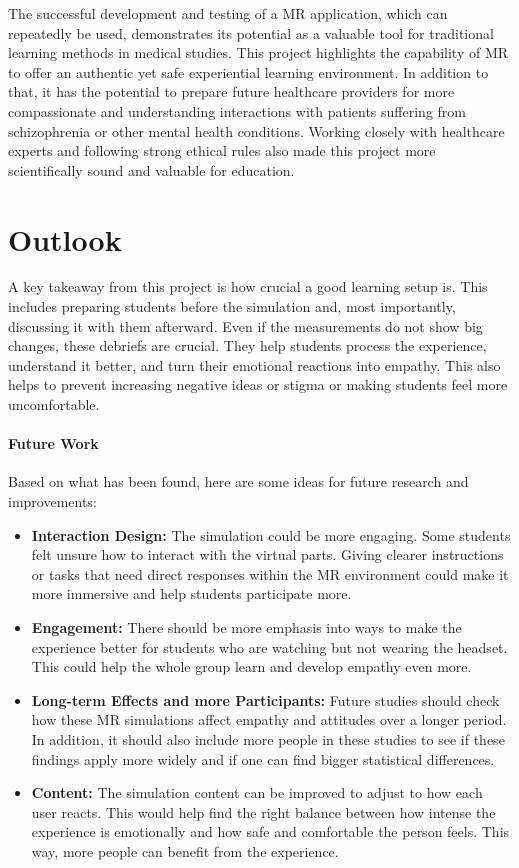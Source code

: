 The successful development and testing of a MR application, which can repeatedly be used, demonstrates its potential as a valuable tool for traditional learning methods in medical studies. This project highlights the capability of MR to offer an authentic yet safe experiential learning environment. In addition to that, it has the potential to prepare future healthcare providers for more compassionate and understanding interactions with patients suffering from schizophrenia or other mental health conditions. Working closely with healthcare experts and following strong ethical rules also made this project more scientifically sound and valuable for education.

\section{Outlook}

A key takeaway from this project is how crucial a good learning setup is. This includes preparing students before the simulation and, most importantly, discussing it with them afterward. Even if the measurements do not show big changes, these debriefs are crucial. They help students process the experience, understand it better, and turn their emotional reactions into empathy. This also helps to prevent increasing negative ideas or stigma or making students feel more uncomfortable.

\paragraph{Future Work}
Based on what has been found, here are some ideas for future research and improvements:

\begin{itemize}
    \item \textbf{Interaction Design:} The simulation could be more engaging. Some students felt unsure how to interact with the virtual parts. Giving clearer instructions or tasks that need direct responses within the MR environment could make it more immersive and help students participate more.
    \item \textbf{Engagement:} There should be more emphasis into ways to make the experience better for students who are watching but not wearing the headset. This could help the whole group learn and develop empathy even more.
    \item \textbf{Long-term Effects and more Participants:} Future studies should check how these MR simulations affect empathy and attitudes over a longer period. In addition, it should also include more people in these studies to see if these findings apply more widely and if one can find bigger statistical differences.
    \item \textbf{Content:} The simulation content can be improved to adjust to how each user reacts. This would help find the right balance between how intense the experience is emotionally and how safe and comfortable the person feels. This way, more people can benefit from the experience.
\end{itemize}

